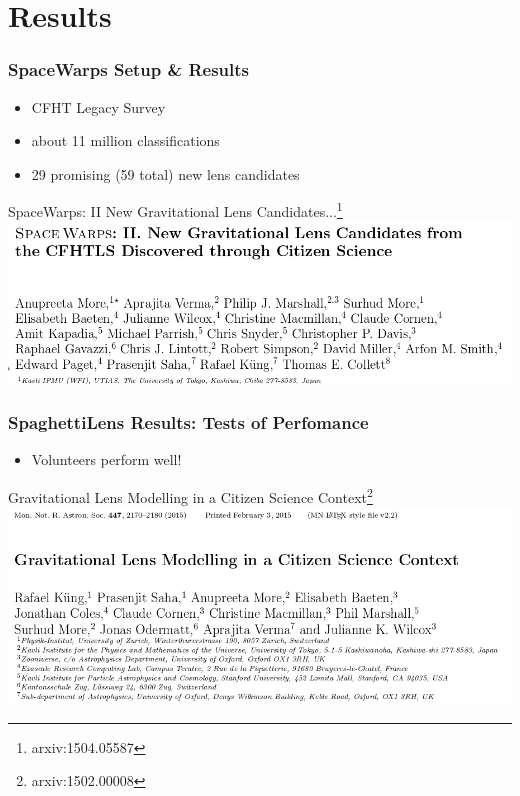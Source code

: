 \documentclass[aspectratio=1610]{beamer}
\begin{document}
\section{Results}

 \begin{frame}
   \frametitle{SpaceWarps Setup \& Results}
   \begin{itemize}
     \item CFHT Legacy Survey
     \item about 11 million classifications
     \item 29 promising (59 total) new lens candidates
   \end{itemize}
   
   \begin{block}{SpaceWarps: II New Gravitational Lens Candidates...\footnote{arxiv:1504.05587}}
     \includegraphics[width=\textwidth]{imgs/paper_sw2}
   \end{block}

 \end{frame}


 \begin{frame}
   \frametitle{SpaghettiLens Results: Tests of Perfomance}
   \begin{itemize}
     \item Volunteers perform well!
   \end{itemize}

   \begin{block}{Gravitational Lens Modelling in a Citizen Science Context\footnote{arxiv:1502.00008}}
     \includegraphics[width=\textwidth]{imgs/paper_sl1}
   \end{block}

 \end{frame}
\end{document}
